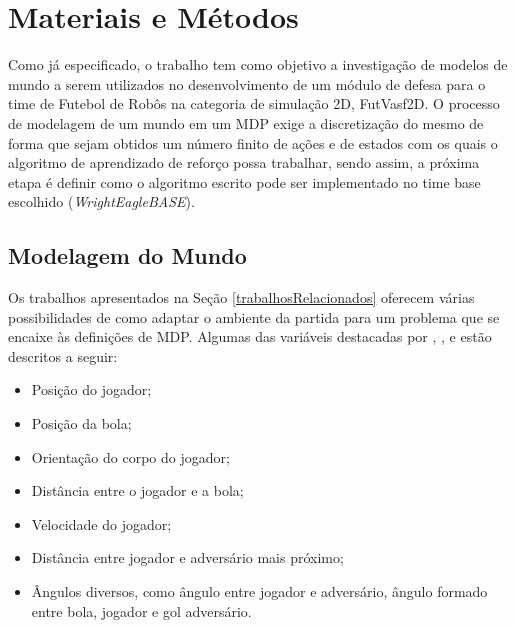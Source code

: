 \chapter{Materiais e Métodos} \label{sec:newModule} %

Como já especificado, o trabalho tem como objetivo a investigação de modelos de
mundo a serem utilizados no desenvolvimento de um módulo de defesa para o time de
Futebol de Robôs na categoria de simulação 2D, FutVasf2D. O processo de
modelagem de um mundo em um MDP exige a discretização do mesmo de forma que
sejam obtidos um número finito de ações e de estados com os quais o algoritmo de
aprendizado de reforço possa trabalhar, sendo assim, a próxima etapa é definir
como o algoritmo escrito pode ser implementado no time base escolhido
(\textit{WrightEagleBASE}).

\section{Modelagem do Mundo}\label{modelagem}

Os trabalhos apresentados na Seção \ref{trabalhosRelacionados} oferecem várias
possibilidades de como adaptar o ambiente da partida para um problema que se
encaixe às definições de MDP. Algumas das variáveis destacadas por
, ,
 e  estão descritos a
seguir:

\begin{itemize}
    \item Posição do jogador;
    \item Posição da bola;
    \item Orientação do corpo do jogador;
    \item Distância entre o jogador e a bola;
    \item Velocidade do jogador;
    \item Distância entre jogador e adversário mais próximo;
    \item Ângulos diversos, como ângulo entre jogador e adversário, ângulo
    formado entre bola, jogador e gol adversário.
\end{itemize}

